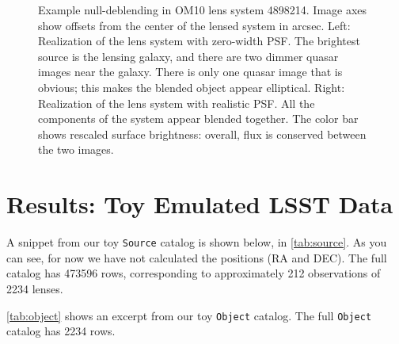 \documentclass[\docopts]{\docclass}
\def\Object{\texttt{Object}\xspace}
\def\Source{\texttt{Source}\xspace}
\begin{document}
\begin{figure}
\begin{minipage}{0.48\linewidth}
    \end{minipage}
    \caption{Example null-deblending in OM10 lens system 4898214. Image
    axes show offsets from the  center of the lensed system in arcsec.
    Left: Realization of the lens system with zero-width PSF. The
    brightest source is the lensing galaxy, and there are two dimmer
    quasar images near the galaxy. There is only one quasar image that
    is obvious; this makes the blended object appear elliptical. Right:
    Realization of the lens system with realistic PSF. All the
    components of the system appear blended together. The color bar
    shows rescaled surface brightness: overall, flux is conserved
    between the two images.}
    \label{fig:null-deblend}
\end{figure}


\section{Results: Toy Emulated LSST Data}
\label{sec:data}

A snippet from our toy \Source catalog is shown below, in
\autoref{tab:source}. As you can see, for now we have not calculated the positions (RA and DEC). The full catalog has 473596 rows, corresponding to approximately 212 observations of 2234 lenses.

\autoref{tab:object} shows an excerpt from our toy \Object catalog. The full \Object catalog has 2234 rows.
\end{document}
